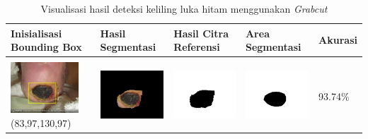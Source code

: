 \begin{table}[H]
	\centering
	\caption{Visualisasi hasil deteksi keliling luka hitam menggunakan \emph{Grabcut}}
	\label{tabel_hasil_4}
	\begin{tabular}{|m{1.0in}|m{1.0in}|m{1.0in}|m{1.0in}|m{0.6in}|}
		\hline
		\textbf{Inisialisasi Bounding Box} & \textbf{Hasil Segmentasi} & \textbf{Hasil Citra Referensi} & \textbf{Area Segmentasi} & \textbf{Akurasi} \\
		\hline

		&  &  & \\
		\includegraphics[width=1.0in]{gambar/hasil_segmentasi/luka_hitam/image_6_rect.jpg} {\centering\fontsize{10}{10}\selectfont(83,97,130,97)}&
		\includegraphics[width=1.0in]{gambar/hasil_segmentasi/luka_hitam/result_6.jpg}&
		\includegraphics[width=1.0in]{gambar/hasil_segmentasi/luka_hitam/mask_r_6.jpg}&
		\includegraphics[width=1.0in]{gambar/hasil_segmentasi/luka_hitam/6_r.jpg}&
		93.74\% \\
		\hline


\end{tabular}
\end{table}
